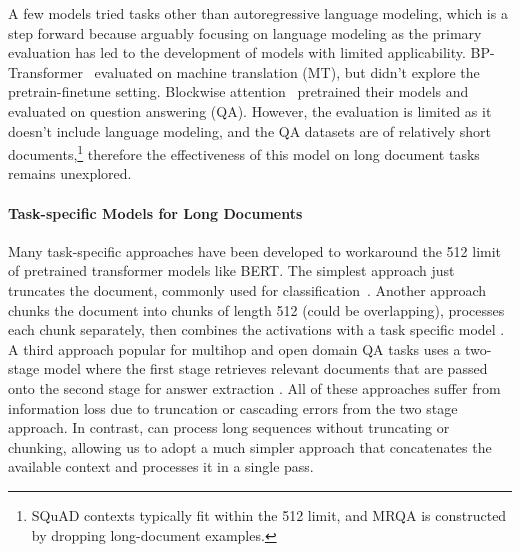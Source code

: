 A few models tried tasks other than autoregressive language modeling,
which is 
a step forward because arguably focusing on 
language modeling as the primary evaluation
has led to the development of models with limited applicability.  BP-Transformer~\cite{BPTransformer} evaluated on 
machine translation (MT), but didn't explore the pretrain-finetune setting.
Blockwise attention~\cite{blockbert} pretrained their models and evaluated 
on question answering (QA). However, the evaluation is 
limited as it doesn't include language modeling, and the QA datasets
are of relatively short documents,\footnote{
SQuAD contexts typically fit within the 512 limit, 
and MRQA is constructed by dropping long-document examples. 
} therefore the effectiveness of this model on long document tasks remains unexplored.

\paragraph{Task-specific Models for Long Documents}
Many task-specific approaches have been developed to 
workaround the 512 limit of pretrained transformer models like BERT.
The simplest approach just truncates the document, commonly used for classification~\cite{truncateimdb}. 
Another approach chunks the document into chunks of 
length 512 (could be overlapping), processes each chunk separately, then combines the activations with a task specific model \cite{joshi-etal-2019-bert}.
A third approach popular for multihop and open domain QA tasks uses a two-stage model where the first stage retrieves relevant documents that are passed onto the second stage for answer extraction \cite{Clark2017SimpleAE,Chen2017ReadingWT}.
All of these approaches suffer from information loss due to truncation or cascading errors from the two stage approach.
In contrast, \model can process long sequences without truncating or chunking, allowing us to adopt a much simpler approach that concatenates the available context and processes it in a single pass. 


